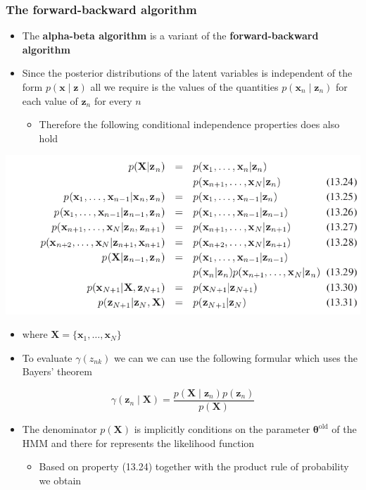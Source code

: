 \documentclass[11pt]{article}
\begin{document}
\subsubsection{The forward-backward algorithm}
\label{sec:orgf966f04}
\begin{itemize}
\item The \textbf{alpha-beta algorithm} is a variant of the \textbf{forward-backward algorithm}

\item Since the posterior distributions of the latent variables is independent of the form \(p(\pmb x \mid \pmb z)\) all we require is the values of the quantities \(p(\pmb x_n \mid \pmb z_n)\) for each value of \(\pmb z_n\) for every \(n\)
\begin{itemize}
\item Therefore the following conditional independence properties does also hold
\end{itemize}
\end{itemize}
\begin{center}
\includegraphics[width=.9\linewidth]{Sequential Data/screenshot_2018-10-30_09-50-41.png}
\end{center}
\begin{itemize}
\item where \(\pmb X = \{\pmb x_1, \dots, \pmb x_N\}\)

\item To evaluate \(\gamma (z_{nk})\) we can we can use the following formular which uses the Bayers' theorem
\end{itemize}
\begin{equation}
  \gamma (\pmb z_n \mid \pmb X) = \frac{p(\pmb X \mid \pmb z_n)p(\pmb z_n)}{p(\pmb X)}
\end{equation}
\begin{itemize}
\item The denominator \(p(\pmb X)\) is implicitly conditions on the parameter \(\pmb \theta^\text{old}\) of the HMM and there for represents the likelihood function
\begin{itemize}
\item Based on property (13.24) together with the product rule of probability we obtain
\end{itemize}
\end{itemize}
\end{document}
